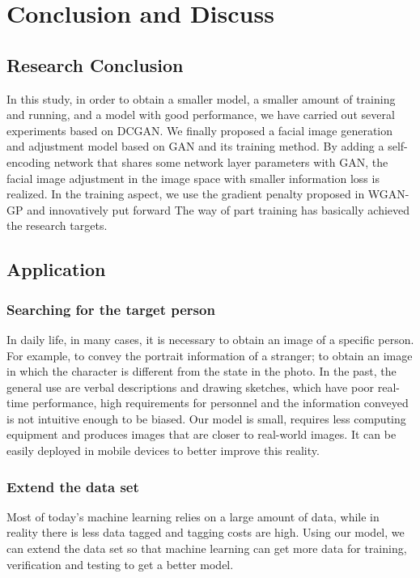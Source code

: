 \section{Conclusion and Discuss}
\subsection{Research Conclusion}
In this study, in order to obtain a smaller model, a smaller amount of training and running, and a model with good performance, we have carried out several experiments based on DCGAN.
We finally proposed a facial image generation and adjustment model based on GAN and its training method.
By adding a self-encoding network that shares some network layer parameters with GAN, the facial image adjustment in the image space with smaller information loss is realized.
In the training aspect, we use the gradient penalty proposed in WGAN-GP and innovatively put forward The way of part training has basically achieved the research targets.

\subsection{Application}
\subsubsection*{Searching for the target person}
In daily life, in many cases, it is necessary to obtain an image of a specific person.
For example, to convey the portrait information of a stranger; to obtain an image in which the character is different from the state in the photo.
In the past, the general use are verbal descriptions and drawing sketches, which have poor real-time performance, high requirements for personnel and the information conveyed is not intuitive enough to be biased.
Our model is small, requires less computing equipment and produces images that are closer to real-world images.
It can be easily deployed in mobile devices to better improve this reality.
\subsubsection*{Extend the data set}
Most of today's machine learning relies on a large amount of data, while in reality there is less data tagged and tagging costs are high.
Using our model, we can extend the data set so that machine learning can get more data for training, verification and testing to get a better model.
